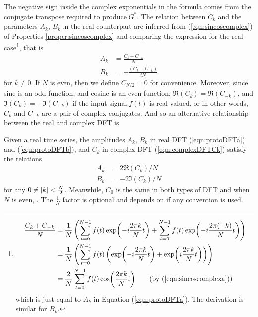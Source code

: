 The negative sign inside the complex exponentials in the formula comes from the conjugate transpose required to produce $G^*$. The relation between $C_k$ and the parameters $A_k$, $B_k$ in the real counterpart are inferred from (\ref{eqn:sincoscomplex}) of Properties \ref{proper:sincoscomplex} and comparing the expression for the real case\footnote{\begin{align*}
\frac{C_k + C_{-k}}{N} &= \frac{1}{N}\left(\sum_{t=0}^{N-1} f(t)\exp(-i\frac{2\pi k}{N}t) + \sum_{t=0}^{N-1} f(t)\exp(-i\frac{2\pi (-k)}{N}t)\right) \\ 
&= \frac{1}{N}\left(\sum_{t=0}^{N-1} f(t)\left(\exp(-i\frac{2\pi k}{N}t) + \exp(i\frac{2\pi k}{N}t)\right)\right) \\
&= \frac{2}{N} \sum_{t=0}^{N-1} f(t) \cos(\frac{2\pi k}{N}t) \qquad \text{(by (\ref{eqn:sincoscomplexa}))}
\end{align*}
which is just equal to $A_k$ in Equation (\ref{eqn:protoDFTa}). The derivation is similar for $B_k$.}, that is
\begin{subequations}
\begin{align}
A_k &= \frac{C_k + C_{-k}}{N} \\
B_k &= -\frac{(C_k - C_{-k})}{iN}
\end{align}    
\end{subequations}
for $k \neq 0$. If $N$ is even, then we define $C_{N/2} = 0$ for convenience. Moreover, since sine is an odd function, and cosine is an even function, $\Re(C_k) = \Re(C_{-k})$, and $\Im(C_k) = -\Im(C_{-k})$ if the input signal $f(t)$ is real-valued, or in other words, $C_k$ and $C_{-k}$ are a pair of complex conjugates. And so an alternative relationship between the real and complex DFT is
\begin{proper}
\label{proper:FTrealcomplex}
Given a real time series, the amplitudes $A_k$, $B_k$ in real DFT (\ref{eqn:protoDFTa}) and (\ref{eqn:protoDFTb}), and $C_k$ in complex DFT (\ref{eqn:complexDFTCk}) satisfy the relations
\begin{subequations}
\begin{align}
A_k &= 2\Re(C_k)/N \\
B_k &= -2\Im(C_k)/N
\end{align}    
\end{subequations}
for any $0 \neq \abs{k} < \frac{N}{2}$. Meanwhile, $C_0$ is the same in both types of DFT and when $N$ is even, . The $\frac{1}{N}$ factor is optional and depends on if any convention is used.
\end{proper}

